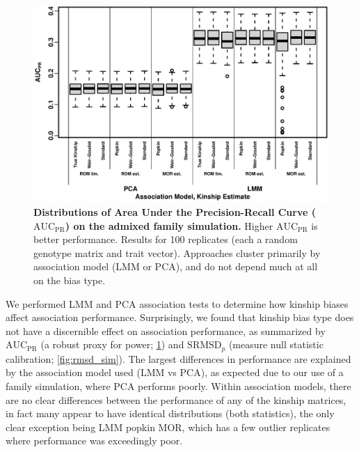 \documentclass[11pt]{article}
\newcommand{\rmsd}{\text{SRMSD}_p}
\newcommand{\auc}{\text{AUC}_\text{PR}}
\begin{document}
\begin{figure}[bp!]
  \centering
  \includegraphics[width=\textwidth]{sim-admix-n1000-m100000-k3-f0.3-s0.5-mc100-h0.8-g20-fes/auc.pdf}
  \caption{
    {\bf Distributions of Area Under the Precision-Recall Curve ($\auc$) on the admixed family simulation.}
    Higher $\auc$ is better performance.
    Results for 100 replicates (each a random genotype matrix and trait vector).
    Approaches cluster primarily by association model (LMM or PCA), and do not depend much at all on the bias type.
  }
  \label{fig:auc_sim}
\end{figure}

We performed LMM and PCA association tests to determine how kinship biases affect association performance.
Surprisingly, we found that kinship bias type does not have a discernible effect on association performance, as summarized by $\auc$ (a robust proxy for power; \cref{fig:auc_sim}) and $\rmsd$ (measure null statistic calibration; \cref{fig:rmsd_sim}).
The largest differences in performance are explained by the association model used (LMM vs PCA), as expected due to our use of a family simulation, where PCA performs poorly.
Within association models, there are no clear differences between the performance of any of the kinship matrices, in fact many appear to have identical distributions (both statistics), the only clear exception being LMM popkin MOR, which has a few outlier replicates where performance was exceedingly poor.
\end{document}
